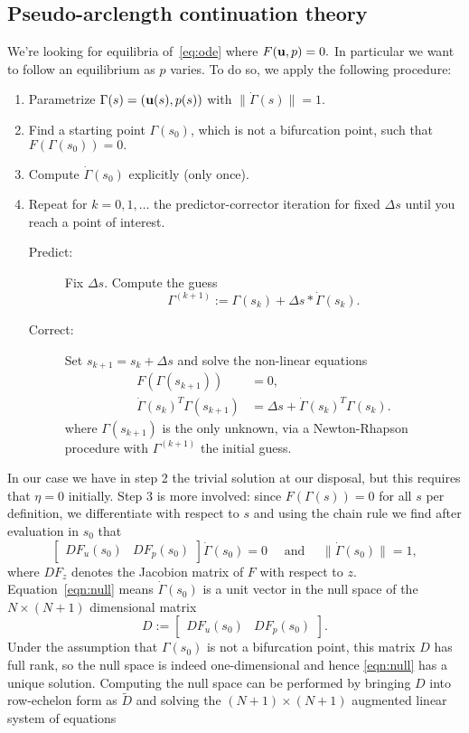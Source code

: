 \subsection{Pseudo-arclength continuation theory}
We're looking for equilibria of~\eqref{eq:ode} where $F(\mathbf{u}, p) = 0.$ In particular we want to follow an equilibrium as $p$ varies. To do so, we apply the following procedure:
\begin{enumerate}
  \item Parametrize $\Gamma(s) = (\mathbf{u}(s), p(s))$ with $\|\dot\Gamma(s)\| = 1.$
  \item Find a starting point $\Gamma(s_0)$, which is not a bifurcation point, such that $F(\Gamma(s_0)) = 0.$ 
  \item Compute $\dot\Gamma(s_0)$ explicitly (only once).
  \item Repeat for $k = 0, 1, \dots$ the predictor-corrector iteration for fixed $\Delta s$ until you reach a point of interest.
  \begin{description}
    \item[Predict:] Fix $\Delta s.$ Compute the guess $$\Gamma^{(k+1)} := \Gamma(s_k) + \Delta s * \dot\Gamma(s_k).$$
    \item[Correct:] Set $s_{k+1} = s_k + \Delta s$ and solve the non-linear equations \begin{equation}\begin{aligned}\label{eq:hoi}
      F(\Gamma(s_{k+1})) &= 0, \\
      \dot\Gamma(s_k)^T\Gamma(s_{k+1}) &= \Delta s + \dot\Gamma(s_k)^T\Gamma(s_k).
    \end{aligned}
    \end{equation}
    where $\Gamma(s_{k+1})$ is the only unknown, via a Newton-Rhapson procedure with $\Gamma^{(k+1)}$ the initial guess.
  \end{description}
\end{enumerate}
In our case we have in step 2 the trivial solution at our disposal, but this requires that $\eta = 0$ initially. Step 3 is more involved: since $F(\Gamma(s)) = 0$ for all $s$ per definition, we differentiate with respect to $s$ and using the chain rule we find after evaluation in $s_0$ that
\begin{equation}\label{eqn:null}
  \begin{bmatrix}
    DF_u(s_0) & DF_p(s_0)
  \end{bmatrix}\Dot\Gamma(s_0)
  = 0 \quad \text{ and } \quad \|\dot\Gamma(s_0)\| = 1,
\end{equation}
where $DF_z$ denotes the Jacobion matrix of $F$ with respect to $z.$ Equation~\eqref{eqn:null} means $\dot\Gamma(s_0)$ is a unit vector in the null space of the $N \times (N + 1)$ dimensional matrix $$D := \begin{bmatrix} DF_u(s_0) & DF_p(s_0) \end{bmatrix}.$$ Under the assumption that $\Gamma(s_0)$ is not a bifurcation point, this matrix $D$ has full rank, so the null space is indeed one-dimensional and hence \eqref{eqn:null} has a unique solution. Computing the null space can be performed by bringing $D$ into row-echelon form as $\tilde{D}$ and solving the $(N + 1) \times (N + 1)$ augmented linear system of equations
